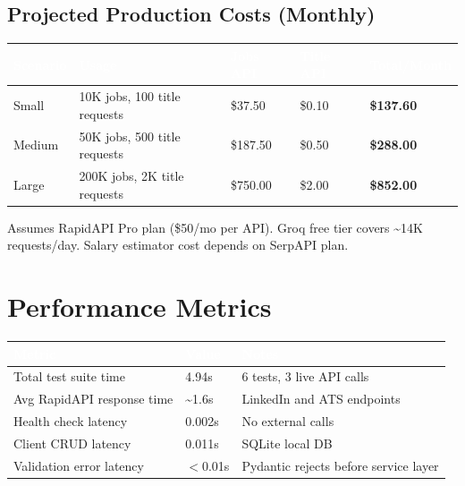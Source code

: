 \documentclass[11pt, a4paper]{article}
\begin{document}
\subsection{Projected Production Costs (Monthly)}

\begin{center}\small
\begin{tabularx}{\textwidth}{|L{3cm}|X|R{2cm}|R{2cm}|R{2.5cm}|}
\hline
{}
\textcolor{white}{\textbf{Scenario}} & \textcolor{white}{\textbf{Usage}} & \textcolor{white}{\textbf{Jobs API}} & \textcolor{white}{\textbf{Title API}} & \textcolor{white}{\textbf{Total/Month}} \\
\hline
Small & 10K jobs, 100 title requests & \$37.50 & \$0.10 & \textbf{\$137.60} \\
Medium & 50K jobs, 500 title requests & \$187.50 & \$0.50 & \textbf{\$288.00} \\
Large & 200K jobs, 2K title requests & \$750.00 & \$2.00 & \textbf{\$852.00} \\
\hline
\end{tabularx}
\end{center}

{\footnotesize * Assumes RapidAPI Pro plan (\$50/mo per API). Groq free tier covers \textasciitilde14K requests/day. Salary estimator cost depends on SerpAPI plan.}

\section{Performance Metrics}

\begin{center}\small
\begin{tabularx}{\textwidth}{|L{5cm}|R{3cm}|X|}
\hline
{}
\textcolor{white}{\textbf{Metric}} & \textcolor{white}{\textbf{Value}} & \textcolor{white}{\textbf{Notes}} \\
\hline
Total test suite time & 4.94s & 6 tests, 3 live API calls \\
Avg RapidAPI response time & \textasciitilde1.6s & LinkedIn and ATS endpoints \\
Health check latency & 0.002s & No external calls \\
Client CRUD latency & 0.011s & SQLite local DB \\
Validation error latency & $<$0.01s & Pydantic rejects before service layer \\
\hline
\end{tabularx}
\end{center}
\end{document}
